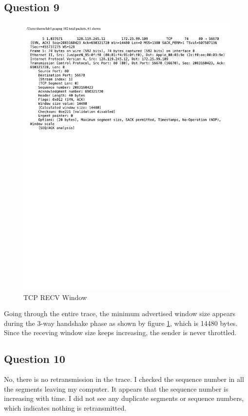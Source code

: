 \documentclass[titlepage, paper=a4, fontsize=11pt]{scrartcl} %
\numberwithin{equation}{section} %
\numberwithin{figure}{section} %
\numberwithin{table}{section} %
\begin{document}
\subsection*{Question 9}
\begin{figure}[!ht]
    \centering
    \includegraphics[width=\textwidth]{images/lab1-q9.pdf}
    \caption{TCP RECV Window}
    \label{fig:tcp-rcv-window}
\end{figure}
Going through the entire trace, the minimum advertised window size appears during the 3-way handshake phase as shown by figure \ref{fig:tcp-rcv-window}, which is 14480 bytes. Since the receving window size keeps increasing, the sender is never throttled. \\

\subsection*{Question 10}
No, there is no retransmission in the trace. I checked the sequence number in all the segments leaving my computer. It appears that the sequence number is increasing with time. I did not see any duplicate segments or sequence numbers, which indicates nothing is retransmitted. \\
\end{document}
